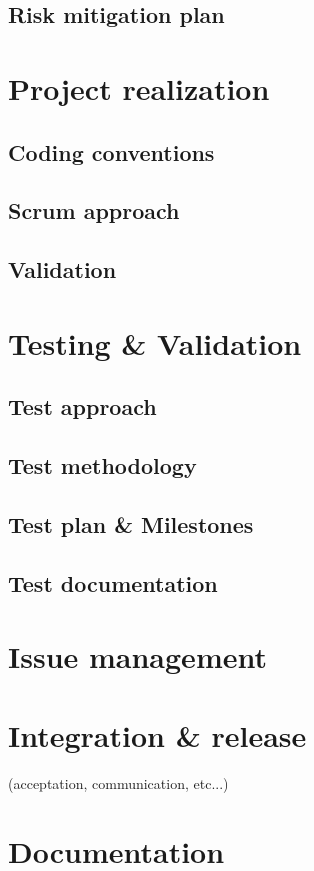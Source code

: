 \documentclass[a4paper,12pt,abstracton,titlepage]{scrartcl}
\begin{document}
\subsection{Risk mitigation plan}

\section{Project realization}
\subsection{Coding conventions}
\subsection{Scrum approach}
\subsection{Validation}

\section{Testing \& Validation}
\subsection{Test approach}
\subsection{Test methodology}
\subsection{Test plan \& Milestones}
\subsection{Test documentation}

\section{Issue management}

\section{Integration \& release}
(acceptation, communication, etc...)

\section{Documentation}
\end{document}
